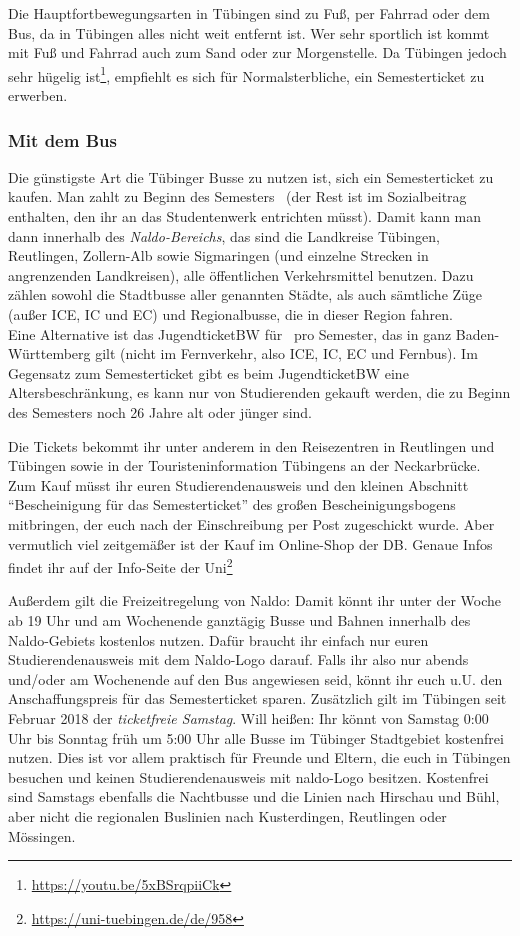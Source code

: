 Die Hauptfortbewegungsarten in Tübingen sind zu Fuß, per Fahrrad oder dem Bus, da in Tübingen alles nicht weit entfernt ist. Wer sehr sportlich ist kommt mit Fuß und Fahrrad auch zum Sand oder zur Morgenstelle. Da Tübingen jedoch sehr hügelig ist\footnote{\url{https://youtu.be/5xBSrqpiiCk}}, empfiehlt es sich für Normalsterbliche, ein Semesterticket zu erwerben.	%
\vfill \pagebreak
\subsubsection*{Mit dem Bus}
Die günstigste Art die Tübinger Busse zu nutzen ist, sich ein Semesterticket zu kaufen. Man zahlt zu Beginn des
Semesters \semesterticketpreis \ (der Rest ist im Sozialbeitrag enthalten, den ihr an das Studentenwerk entrichten müsst).
Damit kann man dann innerhalb des \emph{Naldo-Bereichs}, das sind die Landkreise Tübingen, Reutlingen, Zollern-Alb
sowie Sigmaringen (und einzelne Strecken in angrenzenden Landkreisen), alle öffentlichen Verkehrsmittel benutzen.
Dazu zählen sowohl die Stadtbusse aller genannten Städte, als auch sämtliche Züge (außer ICE, IC und EC) und Regionalbusse,
die in dieser Region fahren. \\
Eine Alternative ist das JugendticketBW für \jugendticketbwpreis \ pro Semester,
das in ganz Baden-Württemberg gilt (nicht im Fernverkehr, also ICE, IC, EC und Fernbus).
Im Gegensatz zum Semesterticket gibt es beim JugendticketBW eine Altersbeschränkung,
es kann nur von Studierenden gekauft werden, die zu Beginn des Semesters noch 26 Jahre alt oder jünger sind.

Die Tickets bekommt ihr unter anderem in den Reisezentren in Reutlingen und Tübingen sowie in der Touristeninformation
Tübingens an der Neckarbrücke. Zum Kauf müsst ihr euren Studierendenausweis und den kleinen Abschnitt "`Bescheinigung für
das Semesterticket"' des großen Bescheinigungsbogens mitbringen, der euch nach der Einschreibung per Post zugeschickt
wurde. Aber vermutlich viel zeitgemäßer ist der Kauf im Online-Shop der DB. Genaue Infos findet ihr auf der Info-Seite
der Uni\footnote{\url{https://uni-tuebingen.de/de/958}}

Außerdem gilt die Freizeitregelung von Naldo: Damit könnt ihr unter der Woche ab 19 Uhr und am Wochenende ganztägig
Busse und Bahnen innerhalb des Naldo-Gebiets kostenlos nutzen. Dafür braucht ihr einfach nur euren Studierendenausweis
mit dem Naldo-Logo darauf. Falls ihr also nur abends und/oder am Wochenende auf den Bus angewiesen seid, könnt ihr
euch u.U. den Anschaffungspreis für das Semesterticket sparen.
Zusätzlich gilt im Tübingen seit Februar 2018 der \emph{ticketfreie Samstag}. Will heißen: Ihr könnt von Samstag
0:00 Uhr bis Sonntag früh um 5:00 Uhr alle Busse im Tübinger Stadtgebiet kostenfrei nutzen. Dies ist vor allem praktisch
für Freunde und Eltern, die euch in Tübingen besuchen und keinen Studierendenausweis mit naldo-Logo besitzen.
Kostenfrei sind Samstags ebenfalls die Nachtbusse und die Linien nach Hirschau und Bühl, aber nicht die regionalen
Buslinien nach Kusterdingen, Reutlingen oder Mössingen.

